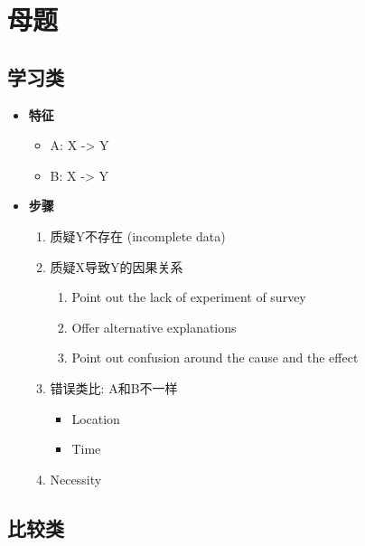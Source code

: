 \section{母题}

  \subsection{学习类}

    \begin{itemize}
      \item \textbf{特征}
      \begin{itemize}
        \item A: X -> Y
        \item B: X -> Y
      \end{itemize}

      \item \textbf{步骤}
      \begin{enumerate}
        \item 质疑Y不存在 (incomplete data)
        \item 质疑X导致Y的因果关系
        \begin{enumerate}
          \item Point out the lack of experiment of survey
          \item Offer alternative explanations
          \item Point out confusion around the cause and the effect
        \end{enumerate}

        \item 错误类比: A和B不一样
        \begin{itemize}
          \item Location
          \item Time
        \end{itemize}

        \item Necessity
      \end{enumerate}
    \end{itemize}

  \subsection{比较类}

